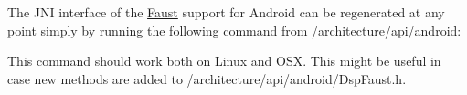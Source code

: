 The J\+NI interface of the \mbox{\hyperlink{struct_faust}{Faust}} support for Android can be regenerated at any point simply by running the following command from {\ttfamily /architecture/api/android}\+:


\begin{DoxyCode}{0}
\end{DoxyCode}


This command should work both on Linux and O\+SX. This might be useful in case new methods are added to {\ttfamily /architecture/api/android/\+Dsp\+Faust.h}. 